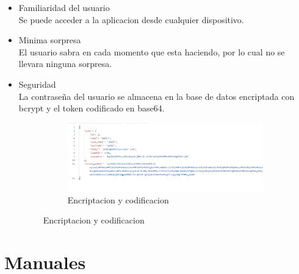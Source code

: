 \documentclass{article}
\begin{document}
\begin{itemize}
\begin{itemize}
\begin{figure}[h]
    \end{figure}
   \end{itemize}
   \item Familiaridad del usuario \\
   \phantom{ab}Se puede acceder a la aplicacion desde cualquier dispositivo.
   \item Minima sorpresa \\
   \phantom{ab}El usuario sabra en cada momento que esta haciendo, por lo cual no se llevara ninguna sorpresa.
   \item Seguridad \\
   \phantom{ab}La contraseña del usuario se almacena en la base de datos encriptada con bcrypt y el token codificado en base64.
   \begin{figure}[h]
    \ContinuedFloat
    \centering
    \begin{subfigure}[h]{0.45\textwidth}
    \includegraphics[scale=0.5]{usability/Segurity.png}
    \caption{Encriptacion y codificacion}
    \label{Fig:Security}
    \end{subfigure}
    
\end{figure}
\end{itemize}
\section{Manuales}
\end{document}
